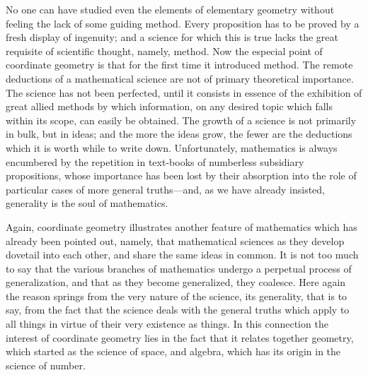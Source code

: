 \documentclass[12pt,leqno]{book}[2005/09/16]
\newcommand{\PageSep}[1]{\ignorespaces}
\begin{document}
No one can have studied even the elements
of elementary geometry without feeling the
lack of some guiding method. Every proposition
has to be proved by a fresh display of ingenuity;
and a science for which this is true
lacks the great requisite of scientific thought,
namely, method. Now the especial point of
coordinate geometry is that for the first
time it introduced method. The remote
deductions of a mathematical science are not
of primary theoretical importance. The
science has not been perfected, until it consists
in essence of the exhibition of great allied
methods by which information, on any desired
topic which falls within its scope, can easily
be obtained. The growth of a science is not
primarily in bulk, but in ideas; and the more
the ideas grow, the fewer are the deductions
which it is worth while to write down. Unfortunately,
mathematics is always encumbered
by the repetition in text-books of
numberless subsidiary propositions, whose importance
has been lost by their absorption
into the role of particular cases of more
general truths---and, as we have already insisted,
generality is the soul of mathematics.
\PageSep{116}

Again, coordinate geometry illustrates
another feature of mathematics which has
already been pointed out, namely, that mathematical
sciences as they develop dovetail into
each other, and share the same ideas in common.
It is not too much to say that the
various branches of mathematics undergo a
perpetual process of generalization, and that
as they become generalized, they coalesce.
Here again the reason springs from the very
nature of the science, its generality, that is
to say, from the fact that the science deals
with the general truths which apply to all
things in virtue of their very existence as
things. In this connection the interest of coordinate
geometry lies in the fact that it
relates together geometry, which started as
the science of space, and algebra, which has
its origin in the science of number.
\end{document}
